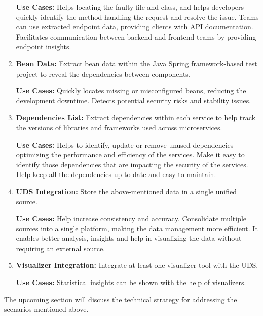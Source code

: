 \begin{enumerate}[before={\vspace{10pt}}, after={\vspace{10pt}}, itemsep=10pt, nosep, leftmargin=\parindent, labelindent=0pt]
    \textbf{Use Cases:} Helps locating the faulty file and class, and helps developers quickly identify the method handling the request and resolve the issue. Teams can use extracted endpoint data, providing clients with API documentation. Facilitates communication between backend and frontend teams by providing endpoint insights.
    \vspace{10pt}
    \item \textbf{Bean Data:} Extract bean data within the Java Spring framework-based test project to reveal the dependencies between components.
    
    \textbf{Use Cases:} Quickly locates missing or misconfigured beans, reducing the development downtime. Detects potential security risks and stability issues.
    \vspace{10pt}
    \item \textbf{Dependencies List:} Extract dependencies within each service to help track the versions of libraries and frameworks used across microservices.
    
    \textbf{Use Cases:} Helps to identify, update or remove unused dependencies optimizing the performance and efficiency of the services. Make it easy to identify those dependencies that are impacting the security of the services. Help keep all the dependencies up-to-date and easy to maintain.
    \vspace{10pt}
    \item \textbf{UDS Integration:} Store the above-mentioned data in a single unified source.
    
    \textbf{Use Cases:} Help increase consistency and accuracy. Consolidate multiple sources into a single platform, making the data management more efficient. It enables better analysis, insights and help in visualizing the data without requiring an external source.
    \vspace{10pt}
    \item \textbf{Visualizer Integration:} Integrate at least one visualizer tool with the UDS.
    
    \textbf{Use Cases:} Statistical insights can be shown with the help of visualizers.
\end{enumerate}

The upcoming section will discuss the technical strategy for addressing the scenarios mentioned above.